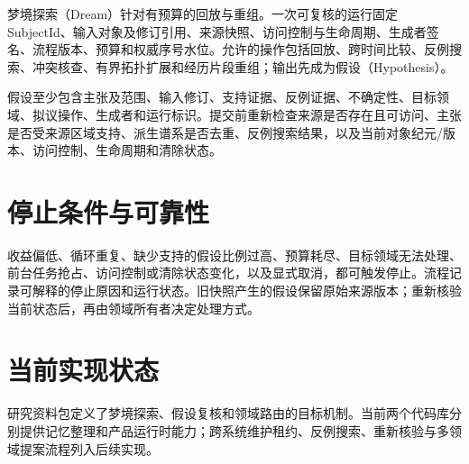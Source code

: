 梦境探索（Dream）针对有预算的回放与重组。一次可复核的运行固定 SubjectId、输入对象及修订引用、来源快照、访问控制与生命周期、生成者签名、流程版本、预算和权威序号水位。允许的操作包括回放、跨时间比较、反例搜索、冲突核查、有界拓扑扩展和经历片段重组；输出先成为假设（Hypothesis）。\cite{nous-research-package}

假设至少包含主张及范围、输入修订、支持证据、反例证据、不确定性、目标领域、拟议操作、生成者和运行标识。提交前重新检查来源是否存在且可访问、主张是否受来源区域支持、派生谱系是否去重、反例搜索结果，以及当前对象纪元/版本、访问控制、生命周期和清除状态。

\section{停止条件与可靠性}

收益偏低、循环重复、缺少支持的假设比例过高、预算耗尽、目标领域无法处理、前台任务抢占、访问控制或清除状态变化，以及显式取消，都可触发停止。流程记录可解释的停止原因和运行状态。旧快照产生的假设保留原始来源版本；重新核验当前状态后，再由领域所有者决定处理方式。\cite{nous-research-package}

\section{当前实现状态}

研究资料包定义了梦境探索、假设复核和领域路由的目标机制。当前两个代码库分别提供记忆整理和产品运行时能力；跨系统维护租约、反例搜索、重新核验与多领域提案流程列入后续实现。
